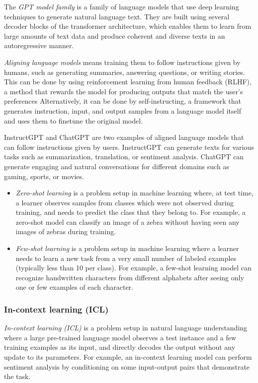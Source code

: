 \documentclass[11pt, a4paper]{amsart}
\begin{document}
The \emph{GPT model family} is a family of language models that use deep learning techniques to generate natural language text.
They are built using several decoder blocks of the transformer architecture, which enables them to learn from large amounts of text data and produce coherent and diverse texts in an autoregressive manner.

\emph{Aligning language models} means training them to follow instructions given by humans, such as generating summaries, answering questions, or writing stories.
This can be done by using reinforcement learning from human feedback (RLHF), a method that rewards the model for producing outputs that match the user’s preferences
Alternatively, it can be done by self-instructing, a framework that generates instruction, input, and output samples from a language model itself and uses them to finetune the original model.

InstructGPT and ChatGPT are two examples of aligned language models that can follow instructions given by users. 
InstructGPT can generate texts for various tasks such as summarization, translation, or sentiment analysis.
ChatGPT can generate engaging and natural conversations for different domains such as gaming, sports, or movies.

\begin{itemize}
	\item \emph{Zero-shot learning} is a problem setup in machine learning where, at test time, a learner observes samples from classes which were not observed during training, and needs to predict the class that they belong to.
	For example, a zero-shot model can classify an image of a zebra without having seen any images of zebras during training.
	
	\item \emph{Few-shot learning} is a problem setup in machine learning where a learner needs to learn a new task from a very small number of labeled examples (typically less than 10 per class).
	For example, a few-shot learning model can recognize handwritten characters from different alphabets after seeing only one or few examples of each character.
\end{itemize}

\subsubsection{In-context learning (ICL)}

\emph{In-context learning (ICL)} is a problem setup in natural language understanding where a large pre-trained language model observes a test instance and a few training examples as its input, and directly decodes the output without any update to its parameters.
For example, an in-context learning model can perform sentiment analysis by conditioning on some input-output pairs that demonstrate the task.
\end{document}
